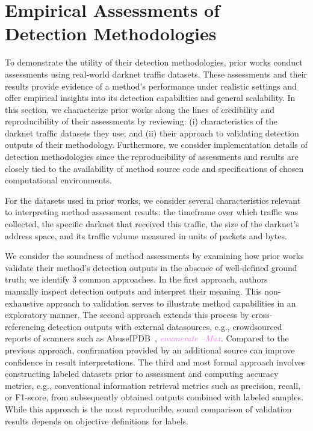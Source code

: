 \documentclass[manuscript,nonacm]{acmart}
\newcommand{\maxnote}[1]{\textit{\textcolor{violet}{#1 --Max}}}
\begin{document}
\label{sec:evaluations}
\section{Empirical Assessments of Detection Methodologies}

To demonstrate the utility of their detection methodologies, prior works conduct assessments using real-world darknet traffic datasets.
These assessments and their results provide evidence of a method's performance under realistic settings and offer empirical insights into its detection capabilities and general scalability.
In this section, we characterize prior works along the lines of credibility and reproducibility of their assessments by reviewing:
(i) characteristics of the darknet traffic datasets they use; and
(ii) their approach to validating detection outputs of their methodology.
Furthermore, we consider implementation details of detection methodologies since the reproducibility of assessments and results are closely tied to the availability of method source code and specifications of chosen computational environments.

\vspace{0.25em}
For the datasets used in prior works, we consider several characteristics relevant to interpreting method assessment results:
the timeframe over which traffic was collected, the specific darknet that received this traffic, the size of the darknet's address space, and its traffic volume measured in units of packets and bytes.

\vspace{0.25em}
We consider the soundness of method assessments by examining how prior works validate their method's detection outputs in the absence of well-defined ground truth; we identify 3 common approaches.
In the first approach, authors~\cite{@@} manually inspect detection outputs and interpret their meaning. This non-exhaustive approach to validation serves to illustrate method capabilities in an exploratory manner.
The second approach extends this process by cross-referencing detection outputs with external datasources, e.g., crowdsourced reports of scanners such as AbuseIPDB~\cite{@@}, \maxnote{enumerate}. Compared to the previous approach, confirmation provided by an additional source can improve confidence in result interpretations.
The third and most formal approach involves constructing labeled datasets prior to assessment and computing accuracy metrics, e.g., conventional information retrieval metrics such as precision, recall, or F1-score, from subsequently obtained outputs combined with labeled samples. While this approach is the most reproducible, sound comparison of validation results depends on objective definitions for labels.
\end{document}

